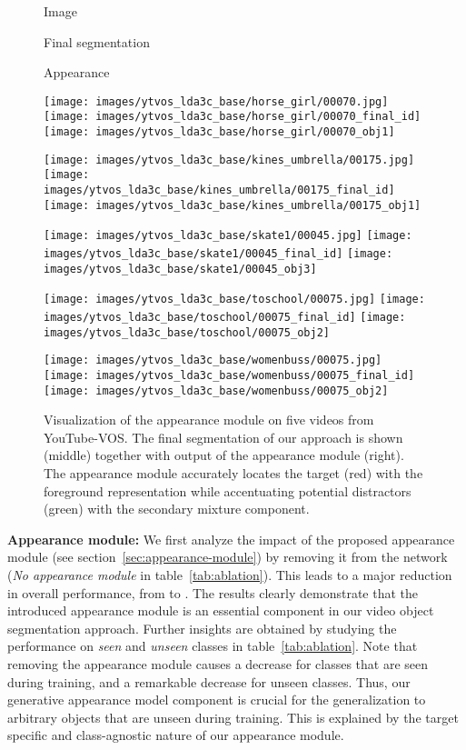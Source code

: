 \documentclass[10pt,twocolumn,letterpaper]{article}
\newcommand{\parsection}[1]{\noindent\textbf{#1:} }
\begin{document}
\begin{figure}[!t]
	\parbox{.32\columnwidth}{\centering\small Image}\parbox{.32\columnwidth}{\centering\small Final segmentation}\parbox{.32\columnwidth}{\centering\small Appearance}
	
	\vspace{.1cm}
	
	\texttt{[image: images/ytvos\_lda3c\_base/horse\_girl/00070.jpg]}
	\texttt{[image: images/ytvos\_lda3c\_base/horse\_girl/00070\_final\_id]}
	\texttt{[image: images/ytvos\_lda3c\_base/horse\_girl/00070\_obj1]}
	
	\texttt{[image: images/ytvos\_lda3c\_base/kines\_umbrella/00175.jpg]}
	\texttt{[image: images/ytvos\_lda3c\_base/kines\_umbrella/00175\_final\_id]}
	\texttt{[image: images/ytvos\_lda3c\_base/kines\_umbrella/00175\_obj1]}
	
	\texttt{[image: images/ytvos\_lda3c\_base/skate1/00045.jpg]}
	\texttt{[image: images/ytvos\_lda3c\_base/skate1/00045\_final\_id]}
	\texttt{[image: images/ytvos\_lda3c\_base/skate1/00045\_obj3]}
	
	\texttt{[image: images/ytvos\_lda3c\_base/toschool/00075.jpg]}
	\texttt{[image: images/ytvos\_lda3c\_base/toschool/00075\_final\_id]}
	\texttt{[image: images/ytvos\_lda3c\_base/toschool/00075\_obj2]}
	
	\texttt{[image: images/ytvos\_lda3c\_base/womenbuss/00075.jpg]}
	\texttt{[image: images/ytvos\_lda3c\_base/womenbuss/00075\_final\_id]}
	\texttt{[image: images/ytvos\_lda3c\_base/womenbuss/00075\_obj2]}
	\caption{Visualization of the appearance module on five videos from YouTube-VOS. The final segmentation of our approach is shown (middle) together with output of the appearance module (right). The appearance module accurately locates the target (red) with the foreground representation while accentuating potential distractors (green) with the secondary mixture component.}\vspace{-3mm}
	\label{fig:qualitative-lda}
\end{figure}
 
\parsection{Appearance module}
We first analyze the impact of the proposed appearance module (see section~\ref{sec:appearance-module}) by removing it from the network (\emph{No appearance module} in table~\ref{tab:ablation}). This leads to a major reduction in overall performance, from  to . The results clearly demonstrate that the introduced appearance module is an essential component in our video object segmentation approach. Further insights are obtained by studying the performance on \emph{seen} and \emph{unseen} classes in table~\ref{tab:ablation}. Note that removing the appearance module causes a  decrease for classes that are seen during training, and a remarkable  decrease for unseen classes. Thus, our generative appearance model component is crucial for the generalization to arbitrary objects that are unseen during training. This is explained by the target specific and class-agnostic nature of our appearance module. 
\end{document}
